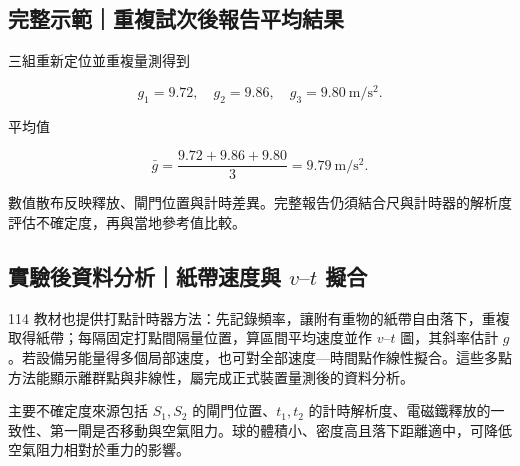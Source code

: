 \documentclass[11pt,a4paper]{article}
\begin{document}
\begin{HandoutWorkedExample}

\subsection{完整示範｜重複試次後報告平均結果}\label{ux5b8cux6574ux793aux7bc4ux91cdux8907ux8a66ux6b21ux5f8cux5831ux544aux5e73ux5747ux7d50ux679c}

三組重新定位並重複量測得到

\[
g_1=9.72,\quad g_2=9.86,\quad g_3=9.80\ \mathrm{m/s^2}.
\]

平均值

\[
\bar g=\frac{9.72+9.86+9.80}{3}=9.79\ \mathrm{m/s^2}.
\]

數值散布反映釋放、閘門位置與計時差異。完整報告仍須結合尺與計時器的解析度評估不確定度，再與當地參考值比較。

\end{HandoutWorkedExample}

\subsection{\texorpdfstring{實驗後資料分析｜紙帶速度與 \(v\text{–}t\) 擬合}{實驗後資料分析｜紙帶速度與 v\textbackslash text\{--\}t 擬合}}\label{ux5be6ux9a57ux5f8cux8cc7ux6599ux5206ux6790ux7d19ux5e36ux901fux5ea6ux8207-vtextt-ux64ecux5408}

114 教材也提供打點計時器方法：先記錄頻率，讓附有重物的紙帶自由落下，重複取得紙帶；每隔固定打點間隔量位置，算區間平均速度並作 \(v\text{–}t\) 圖，其斜率估計 \(g\)。若設備另能量得多個局部速度，也可對全部速度---時間點作線性擬合。這些多點方法能顯示離群點與非線性，屬完成正式裝置量測後的資料分析。

主要不確定度來源包括 \(S_1,S_2\) 的閘門位置、\(t_1,t_2\) 的計時解析度、電磁鐵釋放的一致性、第一閘是否移動與空氣阻力。球的體積小、密度高且落下距離適中，可降低空氣阻力相對於重力的影響。
\end{document}
